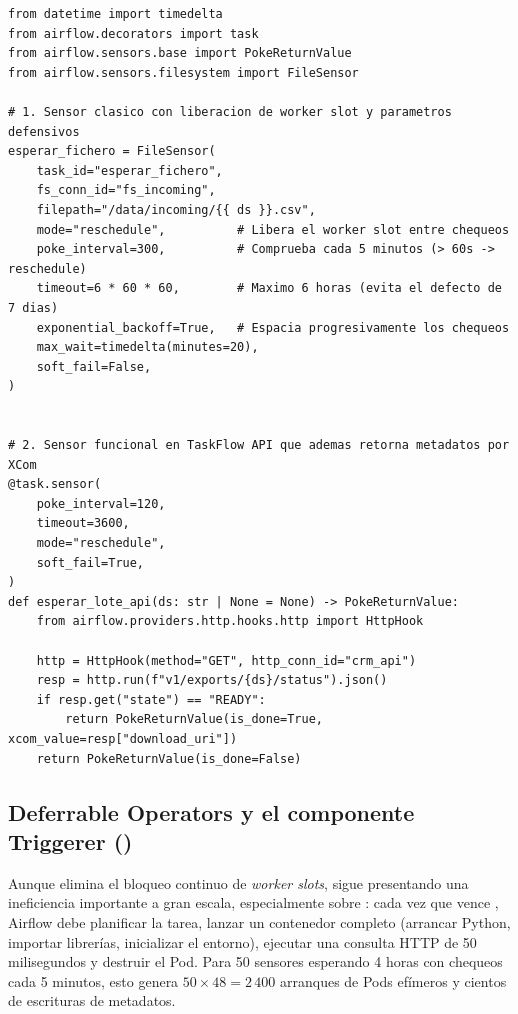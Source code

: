 \begin{lstlisting}[style=python, caption={Sensores eficientes en modo \code{reschedule}: \code{FileSensor} clásico y sensor funcional \code{@task.sensor}.}, label={lst:sensor-reschedule}]
from datetime import timedelta
from airflow.decorators import task
from airflow.sensors.base import PokeReturnValue
from airflow.sensors.filesystem import FileSensor

# 1. Sensor clasico con liberacion de worker slot y parametros defensivos
esperar_fichero = FileSensor(
    task_id="esperar_fichero",
    fs_conn_id="fs_incoming",
    filepath="/data/incoming/{{ ds }}.csv",
    mode="reschedule",          # Libera el worker slot entre chequeos
    poke_interval=300,          # Comprueba cada 5 minutos (> 60s -> reschedule)
    timeout=6 * 60 * 60,        # Maximo 6 horas (evita el defecto de 7 dias)
    exponential_backoff=True,   # Espacia progresivamente los chequeos
    max_wait=timedelta(minutes=20),
    soft_fail=False,
)


# 2. Sensor funcional en TaskFlow API que ademas retorna metadatos por XCom
@task.sensor(
    poke_interval=120,
    timeout=3600,
    mode="reschedule",
    soft_fail=True,
)
def esperar_lote_api(ds: str | None = None) -> PokeReturnValue:
    from airflow.providers.http.hooks.http import HttpHook

    http = HttpHook(method="GET", http_conn_id="crm_api")
    resp = http.run(f"v1/exports/{ds}/status").json()
    if resp.get("state") == "READY":
        return PokeReturnValue(is_done=True, xcom_value=resp["download_uri"])
    return PokeReturnValue(is_done=False)
\end{lstlisting}

\subsection{Deferrable Operators y el componente Triggerer (\texorpdfstring{}{deferrable=True})}

Aunque  elimina el bloqueo continuo de \textit{worker slots}, sigue presentando una ineficiencia importante a gran escala, especialmente sobre : cada vez que vence , Airflow debe planificar la tarea, lanzar un contenedor completo (arrancar Python, importar librerías, inicializar el entorno), ejecutar una consulta HTTP de 50 milisegundos y destruir el Pod. Para 50 sensores esperando 4 horas con chequeos cada 5 minutos, esto genera $50 \times 48 = 2\,400$ arranques de Pods efímeros y cientos de escrituras de metadatos.

